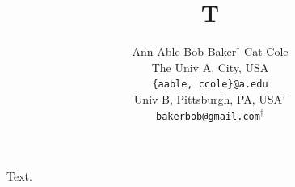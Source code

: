 \documentclass{article}
\title{T}
\author{Ann Able\hspace{0.2in} Bob Baker$^{\dagger}$\hspace{0.2in} Cat Cole \vspace{0.1in} \\ The Univ A, City, USA \\ \texttt{\{aable, ccole\}@a.edu} \vspace{0.1in} \\ Univ B, Pittsburgh, PA, USA$^{\dagger}$ \\ \texttt{bakerbob@gmail.com}$^{\dagger}$}
\begin{document}
\maketitle
Text.
\end{document}
